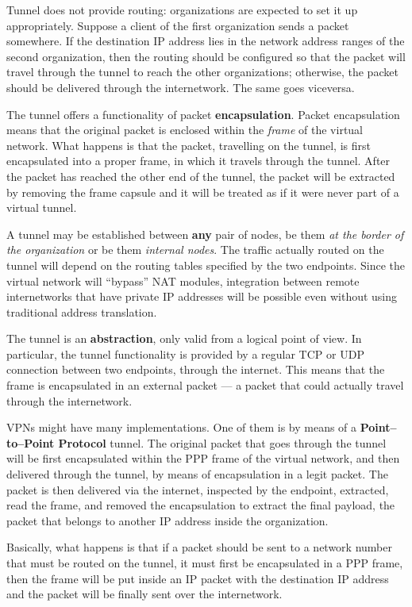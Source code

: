 \documentclass[10pt]{extreport}
\begin{document}
Tunnel does not provide routing: organizations are expected to set it up
appropriately. Suppose a client of the first organization sends a packet
somewhere. If the destination IP address lies in the network address ranges of
the second organization, then the routing should be configured so that the
packet will travel through the tunnel to reach the other organizations;
otherwise, the packet should be delivered through the internetwork. The same
goes viceversa.

The tunnel offers a functionality of packet \textbf{encapsulation}. Packet
encapsulation means that the original packet is enclosed within the
\emph{frame} of the virtual network. What happens is that the packet,
travelling on the tunnel, is first encapsulated into a proper frame, in which
it travels through the tunnel. After the packet has reached the other end of
the tunnel, the packet will be extracted by removing the frame capsule and it
will be treated as if it were never part of a virtual tunnel.

A tunnel may be established between \textbf{any} pair of nodes, be them
\emph{at the border of the organization} or be them \emph{internal nodes}. The
traffic actually routed on the tunnel will depend on the routing tables
specified by the two endpoints. Since the virtual network will ``bypass'' NAT
modules, integration between remote internetworks that have private IP
addresses will be possible even without using traditional address translation.

The tunnel is an \textbf{abstraction}, only valid from a logical point of view.
In particular, the tunnel functionality is provided by a regular TCP or UDP
connection between two endpoints, through the internet. This means that the
frame is encapsulated in an external packet --- a packet that could actually
travel through the internetwork.

VPNs might have many implementations. One of them is by means of a
\textbf{Point--to--Point Protocol} tunnel. The original packet that goes
through the tunnel will be first encapsulated within the PPP frame of the
virtual network, and then delivered through the tunnel, by means of
encapsulation in a legit packet. The packet is then delivered via the internet,
inspected by the endpoint, extracted, read the frame, and removed the
encapsulation to extract the final payload, the packet that belongs to another
IP address inside the organization.

Basically, what happens is that if a packet should be sent to a network number
that must be routed on the tunnel, it must first be encapsulated in a PPP
frame, then the frame will be put inside an IP packet with the destination IP
address and the packet will be finally sent over the internetwork.
\end{document}
